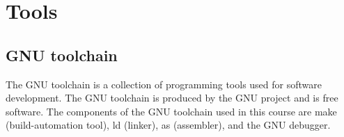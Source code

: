\section{Tools}

\subsection{GNU toolchain}
The GNU toolchain is a collection of programming tools used for software development. The GNU toolchain is produced by the GNU project and is free software. The components of the GNU toolchain used in this course are make (build-automation tool), ld (linker), as (assembler), and the GNU debugger.\cite{gnu.org}

